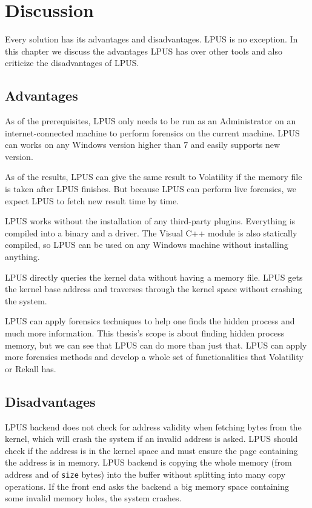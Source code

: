 \chapter[Discussion]{Discussion}

Every solution has its advantages and disadvantages. LPUS is no exception. In
this chapter we discuss the advantages LPUS has over other tools and also
criticize the disadvantages of LPUS.

\section[Advantages]{Advantages}

As of the prerequisites, LPUS only needs to be run as an Administrator on an
internet-connected machine to perform forensics on the current machine. LPUS
can works on any Windows version higher than 7 and easily supports new version.

As of the results, LPUS can give the same result to Volatility if the memory
file is taken after LPUS finishes. But because LPUS can perform live forensics,
we expect LPUS to fetch new result time by time.

LPUS works without the installation of any third-party plugins. Everything is
compiled into a binary and a driver. The Visual C++ module is also statically
compiled, so LPUS can be used on any Windows machine without installing
anything.

LPUS directly queries the kernel data without having a memory file. LPUS gets
the kernel base address and traverses through the kernel space without crashing
the system.

LPUS can apply forensics techniques to help one finds the hidden process and
much more information. This thesis's scope is about finding hidden process
memory, but we can see that LPUS can do more than just that. LPUS can apply
more forensics methods and develop a whole set of functionalities that
Volatility or Rekall has.

\section[Disadvantages]{Disadvantages}

LPUS backend does not check for address validity when fetching bytes from the
kernel, which will crash the system if an invalid address is asked. LPUS should
check if the address is in the kernel space and must ensure the page containing
the address is in memory. LPUS backend is copying the whole memory (from
address and of \texttt{size} bytes) into the buffer without splitting into many
copy operations.  If the front end asks the backend a big memory space
containing some invalid memory holes, the system crashes.

